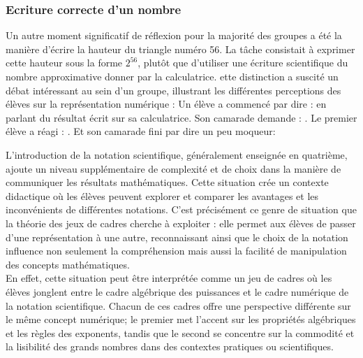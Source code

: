 \subsubsection{Ecriture correcte d'un nombre}

Un autre moment significatif de réflexion pour la majorité des groupes a été la manière d'écrire la hauteur du triangle numéro 56.
La tâche consistait à exprimer cette hauteur sous la forme $2^{56}$,
plutôt que d'utiliser une écriture scientifique du nombre approximative donner par la calculatrice.
ette distinction a suscité un débat intéressant au sein d'un groupe,
illustrant les différentes perceptions des élèves sur la représentation numérique :
Un élève a commencé par dire :  en parlant du résultat écrit sur sa calculatrice.
Son camarade demande : .
Le premier élève a réagi : .
Et son camarade fini par dire un peu moqueur: 



L'introduction de la notation scientifique,
généralement enseignée en quatrième,
ajoute un niveau supplémentaire de complexité et de choix dans la manière de communiquer les résultats mathématiques.
Cette situation crée un contexte didactique où les élèves peuvent explorer et comparer les avantages et les inconvénients de différentes notations.
C'est précisément ce genre de situation que la théorie des jeux de cadres cherche à exploiter :
elle permet aux élèves de passer d'une représentation à une autre,
reconnaissant ainsi que le choix de la notation influence non seulement la compréhension mais aussi la facilité de manipulation des concepts mathématiques.\\

En effet,
cette situation peut être interprétée comme un jeu de cadres où les élèves jonglent entre le cadre algébrique des puissances et le cadre numérique de la notation scientifique.
Chacun de ces cadres offre une perspective différente sur le même concept numérique;
le premier met l'accent sur les propriétés algébriques et les règles des exponents,
tandis que le second se concentre sur la commodité et la lisibilité des grands nombres dans des contextes pratiques ou scientifiques.

